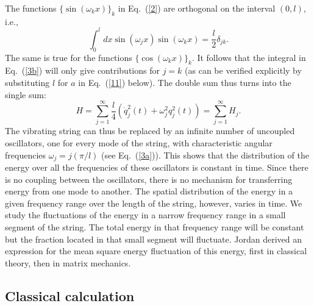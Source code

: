 \documentclass{elsart}
\begin{document}
The functions $\{ \sin{(\omega_k x)} \}_k$ in  Eq.\ (\ref{2}) are orthogonal on the interval $(0, l)$, i.e.,
\begin{equation}
\int_0^l dx   \sin{(\omega_j x)}  \sin{(\omega_k x)}  =  \frac{l}{2} \delta_{jk}.
\label{3c}
\end{equation}
The same is true for the functions $\{ \cos{(\omega_k x)} \}_k$. It follows that the integral in Eq.\ (\ref{3b}) will only give contributions for $j = k$ (as can be verified explicitly by substituting $l$ for $a$ in Eq.\ (\ref{11}) below). The double sum thus turns into the single sum:
\begin{equation}
H  = \sum_{j=1}^\infty \frac{l}{4} \left(  \dot{q}_j^2(t) + \omega_j^2 q_j^2(t)  \right) = \sum_{j=1}^\infty H_j.
\label{4}
\end{equation}
The vibrating string can thus be replaced by an infinite number of uncoupled oscillators, one for every mode of the string, with characteristic angular frequencies $\omega_j = j (\pi/l)$ (see Eq.\ (\ref{3a})). This shows that the distribution of the energy over all the frequencies of these oscillators is constant in time. Since there is no coupling between the oscillators, there is no mechanism for transferring energy from one mode to another. The spatial distribution of the energy in a given frequency range over the length of the string, however, varies in time. We study the fluctuations of the energy in a narrow frequency range in a small segment of the string. The total energy in that frequency range will be constant but the fraction located in that small segment will fluctuate. Jordan derived an expression for the mean square energy fluctuation of this energy, first in classical theory, then in matrix mechanics.

\subsection{Classical calculation}
\end{document}
